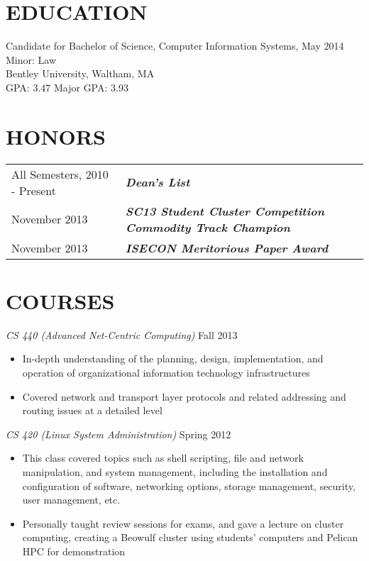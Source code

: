 \documentclass[line, margin]{res}
\begin{document}
\address{6 Cobblers Lane\\ North Reading, MA\\ (978) 505-5359\\ hentschel.nicholas@gmail.com}
\begin{resume}

\section{EDUCATION}
  Candidate for Bachelor of Science, Computer Information Systems, May 2014 \\
  Minor: Law \\
  Bentley University, Waltham, MA \\
  GPA: 3.47 Major GPA: 3.93

\section{HONORS}
\begin{tabular}{@{}l l}
All Semesters, 2010 - Present & \textbf{\textit{Dean's List}} \\ [5pt]
November 2013 & \textbf{\textit{SC13 Student Cluster Competition Commodity Track Champion}} \\ [5pt]
November 2013 & \textbf{\textit{ISECON Meritorious Paper Award}} \\ [5pt]
\end{tabular}

\section{COURSES}
\textit{CS 440 (Advanced Net-Centric Computing)} \hfill Fall 2013
\begin{itemize}
    \item In-depth understanding of the planning, design, implementation, and operation of organizational information technology infrastructures
    \item Covered network and transport layer protocols and related addressing and routing issues at a detailed level
\end{itemize}
\textit{CS 420 (Linux System Administration)} \hfill Spring 2012
\begin{itemize}
    \item This class covered topics such as shell scripting, file and network manipulation, and system management, including the installation and configuration of software, networking options, storage management, security, user management, etc.
    \item Personally taught review sessions for exams, and gave a lecture on cluster computing, creating a Beowulf cluster using students' computers and Pelican HPC for demonstration
\end{itemize}


\end{resume}
\end{document}
